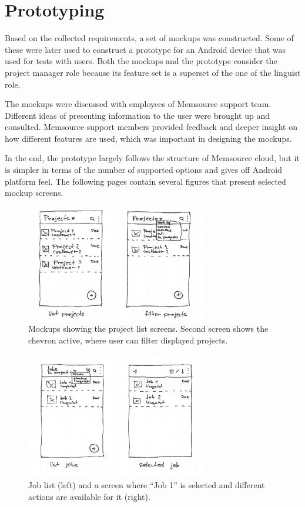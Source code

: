 \section{Prototyping}

Based on the collected requirements, a set of mockups was constructed. Some of these were later used to construct a prototype for an Android device that was used for tests with users. Both the mockups and the prototype consider the project manager role because its feature set is a superset of the one of the linguist role.

The mockups were discussed with employees of Memsource support team. Different ideas of presenting information to the user were brought up and consulted. Memsource support members provided feedback and deeper insight on how different features are used, which was important in designing the mockups.

In the end, the prototype largely follows the structure of Memsource cloud, but it is simpler in terms of the number of supported options and gives off Android platform feel. The following pages contain several figures that present selected mockup screens.



\begin{figure}[]
	\includegraphics[width=0.7\textwidth]{pics/projects1}
	\caption{Mockups showing the project list screens. Second screen shows the chevron active, where user can filter displayed projects.}
	\label{mock2}
\end{figure}

\begin{figure}[]
	\includegraphics[width=0.7\textwidth]{pics/jobs1}
	\caption{Job list (left) and a screen where ``Job 1'' is selected and different actions are available for it (right).}
	\label{mock3}
\end{figure}

